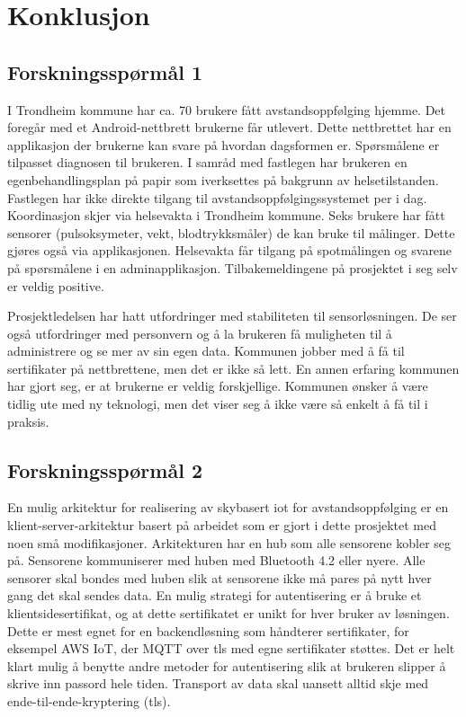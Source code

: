 \chapter{Konklusjon}
\label{ch:conclusion}

\section{Forskningsspørmål 1}
\textbf{}

I Trondheim kommune har ca. 70 brukere fått avstandsoppfølging hjemme. Det
foregår med et Android-nettbrett brukerne får utlevert. Dette nettbrettet har en
applikasjon der brukerne kan svare på hvordan dagsformen er. Spørsmålene er
tilpasset diagnosen til brukeren. I samråd med fastlegen har brukeren en
egenbehandlingsplan på papir som iverksettes på bakgrunn av helsetilstanden. Fastlegen
har ikke direkte tilgang til avstandsoppfølgingssystemet per i dag. Koordinasjon skjer via
helsevakta i Trondheim kommune. Seks brukere har fått sensorer (pulsoksymeter, vekt, blodtrykksmåler) de kan bruke
til målinger. Dette gjøres også via applikasjonen. Helsevakta får tilgang på
spotmålingen og svarene på spørsmålene i en adminapplikasjon.
Tilbakemeldingene på prosjektet i seg selv er veldig positive.

Prosjektledelsen har hatt utfordringer med stabiliteten til sensorløsningen.
De ser også utfordringer med personvern og å la brukeren få muligheten til å administrere og se mer av sin egen data.
Kommunen jobber med å få til sertifikater på nettbrettene, men det er ikke så lett. En annen erfaring
kommunen har gjort seg, er at brukerne er veldig forskjellige. Kommunen ønsker å være tidlig ute med
ny teknologi, men det viser seg å ikke være så enkelt å få til i praksis.

\section{Forskningsspørmål 2}
\textbf{}

En mulig arkitektur for realisering av skybasert \gls{iot} for
avstandsoppfølging er en klient-server-arkitektur basert på arbeidet som er
gjort i dette prosjektet med noen små modifikasjoner. Arkitekturen har en hub som
alle sensorene kobler seg på. Sensorene kommuniserer med huben med Bluetooth 4.2
eller nyere. Alle sensorer skal bondes med huben slik at sensorene ikke må pares
på nytt hver gang det skal sendes data. En mulig strategi for autentisering er å
bruke et klientsidesertifikat, og at dette sertifikatet er unikt for hver bruker
av løsningen. Dette er mest egnet for en backendløsning som håndterer
sertifikater, for eksempel AWS IoT, der MQTT over \gls{tls} med egne sertifikater
støttes. Det er helt klart mulig å benytte andre metoder for autentisering slik
at brukeren slipper å skrive inn passord hele tiden. Transport av data skal
uansett alltid skje med ende-til-ende-kryptering (\gls{tls}).

